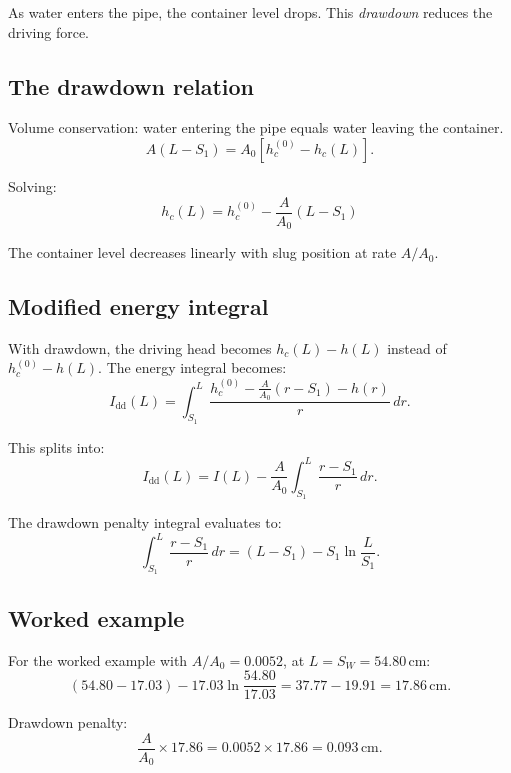 \documentclass[11pt]{article}
\begin{document}
As water enters the pipe, the container level drops. This \emph{drawdown} reduces the driving force.

\subsection{The drawdown relation}

Volume conservation: water entering the pipe equals water leaving the container.
\[
  A(L - S_1) = A_0[h_c^{(0)} - h_c(L)].
\]

Solving:
\begin{equation}
  \boxed{h_c(L) = h_c^{(0)} - \frac{A}{A_0}(L - S_1)}
  \label{eq:drawdown}
\end{equation}

The container level decreases linearly with slug position at rate $A/A_0$.

\subsection{Modified energy integral}

With drawdown, the driving head becomes $h_c(L) - h(L)$ instead of $h_c^{(0)} - h(L)$. The energy integral becomes:
\begin{equation}
  I_{\text{dd}}(L) = \int_{S_1}^{L} \frac{h_c^{(0)} - \frac{A}{A_0}(r - S_1) - h(r)}{r} \, dr.
  \label{eq:I-dd-def}
\end{equation}

This splits into:
\begin{equation}
  I_{\text{dd}}(L) = I(L) - \frac{A}{A_0} \int_{S_1}^{L} \frac{r - S_1}{r} \, dr.
  \label{eq:I-dd-split}
\end{equation}

The drawdown penalty integral evaluates to:
\begin{equation}
  \int_{S_1}^{L} \frac{r - S_1}{r} \, dr = (L - S_1) - S_1 \ln\frac{L}{S_1}.
  \label{eq:drawdown-penalty}
\end{equation}

\subsection{Worked example}

For the worked example with $A/A_0 = 0.0052$, at $L = S_W = 54.80$\,cm:
\[
  (54.80 - 17.03) - 17.03 \ln\frac{54.80}{17.03} = 37.77 - 19.91 = 17.86\,\text{cm}.
\]

Drawdown penalty:
\[
  \frac{A}{A_0} \times 17.86 = 0.0052 \times 17.86 = 0.093\,\text{cm}.
\]
\end{document}
